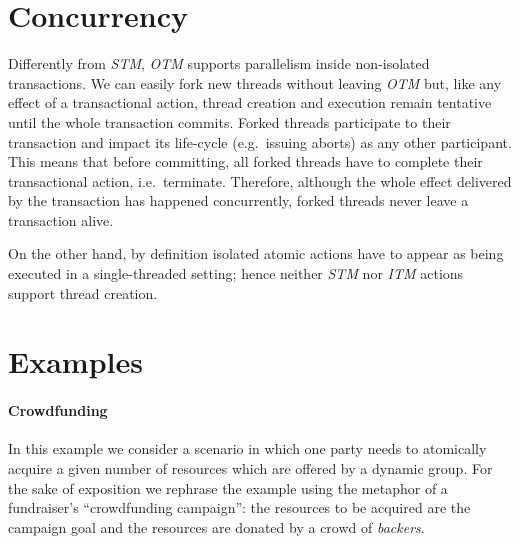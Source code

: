 \section{Concurrency}

Differently from \emph{STM}, \emph{OTM} supports parallelism inside non-isolated transactions.
We can easily fork new threads without leaving \emph{OTM} but, like any effect of a transactional action, thread creation and execution remain tentative until the whole transaction commits. 
Forked threads participate to their transaction and impact its life-cycle (e.g.~issuing aborts) as any other participant.
This means that before committing, all forked threads have to complete their transactional action, i.e.~terminate.
Therefore, although the whole effect delivered by the transaction has happened concurrently, forked threads  never leave a transaction alive.


On the other hand, by definition isolated atomic actions have to appear 
as being executed in a single-threaded setting; hence neither 
\emph{STM} nor \emph{ITM} actions support thread creation.



\section{Examples}
\paragraph{Crowdfunding}
In this example we consider a scenario in which
one party needs to atomically acquire a given number 
of resources which are offered by a dynamic group.
For the sake of exposition we rephrase the example
using the metaphor of a fundraiser's ``crowdfunding campaign'': 
the resources to be acquired are the campaign goal
and the resources are donated by a crowd of \emph{backers}.

